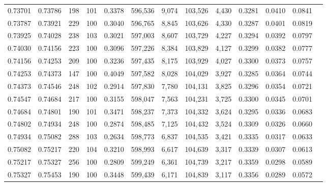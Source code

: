 \begin{tabular}{rrrrrrrrrrrrr}
0.73701 & 0.73786 &   198 & 101 &                                     0.3378 & 596,536 &   9,074 & 103,526 &   4,430 & 0.3281 & 0.0410 & 0.0841 \\
0.73787 & 0.73921 &   229 & 100 &                                     0.3040 & 596,765 &   8,845 & 103,626 &   4,330 & 0.3287 & 0.0401 & 0.0819 \\
0.73925 & 0.74028 &   238 & 103 &                                     0.3021 & 597,003 &   8,607 & 103,729 &   4,227 & 0.3294 & 0.0392 & 0.0797 \\
0.74030 & 0.74156 &   223 & 100 &                                     0.3096 & 597,226 &   8,384 & 103,829 &   4,127 & 0.3299 & 0.0382 & 0.0777 \\
0.74156 & 0.74253 &   209 & 100 &                                     0.3236 & 597,435 &   8,175 & 103,929 &   4,027 & 0.3300 & 0.0373 & 0.0757 \\
0.74253 & 0.74373 &   147 & 100 &                                     0.4049 & 597,582 &   8,028 & 104,029 &   3,927 & 0.3285 & 0.0364 & 0.0744 \\
0.74373 & 0.74546 &   248 & 102 &                                     0.2914 & 597,830 &   7,780 & 104,131 &   3,825 & 0.3296 & 0.0354 & 0.0721 \\
0.74547 & 0.74684 &   217 & 100 &                                     0.3155 & 598,047 &   7,563 & 104,231 &   3,725 & 0.3300 & 0.0345 & 0.0701 \\
0.74684 & 0.74801 &   190 & 101 &                                     0.3471 & 598,237 &   7,373 & 104,332 &   3,624 & 0.3295 & 0.0336 & 0.0683 \\
0.74802 & 0.74934 &   248 & 100 &                                     0.2874 & 598,485 &   7,125 & 104,432 &   3,524 & 0.3309 & 0.0326 & 0.0660 \\
0.74934 & 0.75082 &   288 & 103 &                                     0.2634 & 598,773 &   6,837 & 104,535 &   3,421 & 0.3335 & 0.0317 & 0.0633 \\
0.75082 & 0.75217 &   220 & 104 &                                     0.3210 & 598,993 &   6,617 & 104,639 &   3,317 & 0.3339 & 0.0307 & 0.0613 \\
0.75217 & 0.75327 &   256 & 100 &                                     0.2809 & 599,249 &   6,361 & 104,739 &   3,217 & 0.3359 & 0.0298 & 0.0589 \\
0.75327 & 0.75453 &   190 & 100 &                                     0.3448 & 599,439 &   6,171 & 104,839 &   3,117 & 0.3356 & 0.0289 & 0.0572 \\

\end{tabular}

